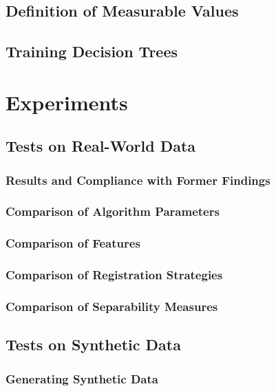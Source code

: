 \documentclass[pdftex,12pt,a4paper]{report}
\begin{document}
\section{Definition of Measurable Values}

\section{Training Decision Trees}

\chapter{Experiments}

\section{Tests on Real-World Data}

\subsection{Results and Compliance with Former Findings}

\subsection{Comparison of Algorithm Parameters}

\subsection{Comparison of Features}

\subsection{Comparison of Registration Strategies}

\subsection{Comparison of Separability Measures}

\section{Tests on Synthetic Data}

\subsection{Generating Synthetic Data}
\end{document}
